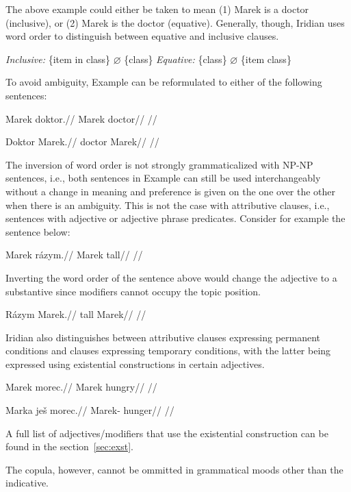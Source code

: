 The above example could either be taken to mean (1) Marek is a doctor (inclusive), or (2) Marek is the doctor (equative). Generally, though, Iridian uses word order to distinguish between equative and inclusive clauses.

\pex
\a \textit{Inclusive:} \{item in class\} $\varnothing$ \{class\}
\a \textit{Equative:} \{class\} $\varnothing$ \{item class\}
\xe

To avoid ambiguity, Example  can be reformulated to either of the following sentences:

\a
\begingl
\gla Marek doktor.//
\glb Marek doctor//
\glft {}//
\endgl

\a
\begingl
\gla Doktor Marek.//
\glb doctor Marek//
\glft {}//
\endgl

\xe

The inversion of word order is not strongly grammaticalized with NP-NP sentences, i.e., both sentences in Example  can still be used interchangeably without a change in meaning and preference is given on the one over the other when there is an ambiguity. This is not the case with attributive clauses, i.e., sentences with adjective or adjective phrase predicates. Consider for example the sentence below:

\pex
\begingl
\gla Marek rázym.//
\glb Marek tall//
\glft {}//
\endgl
\xe

Inverting the word order of the sentence above would change the adjective to a substantive since modifiers cannot occupy the topic position.

\pex
\begingl
\gla Rázym Marek.//
\glb tall Marek//
\glft {}//
\endgl
\xe

Iridian also distinguishes between attributive clauses expressing permanent conditions and clauses expressing temporary conditions, with the latter being expressed using existential constructions in certain adjectives.

\pex
\begingl
\gla *Marek morec.//
\glb Marek hungry//
\glft {}//
\endgl
\xe


\pex
\begingl
\gla Marka ješ morec.//
\glb Marek-\Pat{} \Exst{} hunger//
\glft {}//
\endgl
\xe

A full list of adjectives/modifiers that use the existential construction can be found in the section~\ref{sec:exst}.

The copula, however, cannot be ommitted in grammatical moods other than the indicative.

